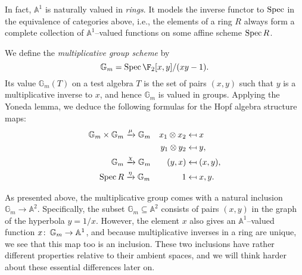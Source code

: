 \begin{remark}
In fact, $\mathbb A^1$ is naturally valued in \emph{rings}. It models the inverse functor to $\operatorname{Spec}$ in the equivalence of categories above, i.e., the elements of a ring $R$ always form a complete collection of $\mathbb A^1$--valued functions on some affine scheme $\operatorname{Spec} R$.
\end{remark}

\begin{example}
We define the \textit{multiplicative group scheme} by \[\mathbb G_m = \Spec \F_2[x, y] / (xy - 1).\]  Its value $\mathbb G_m(T)$ on a test algebra $T$ is the set of pairs $(x, y)$ such that $y$ is a multiplicative inverse to $x$, and hence $\mathbb G_m$ is valued in groups.  Applying the Yoneda lemma, we deduce the following formulas for the Hopf algebra structure maps:
\begin{align*}
\mathbb G_m \times \mathbb G_m & \xrightarrow{\mu} \mathbb G_m & x_1 \otimes x_2 & \mapsfrom x \\
& & y_1 \otimes y_2 & \mapsfrom y, \\
\mathbb G_m & \xrightarrow{\chi} \mathbb G_m & (y, x) & \mapsfrom (x, y), \\
\operatorname{Spec} R & \xrightarrow{\eta} \mathbb G_m & 1 & \mapsfrom x, y.
\end{align*}
\end{example}

\begin{remark}
As presented above, the multiplicative group comes with a natural inclusion $\mathbb G_m \to \mathbb A^2$.  Specifically, the subset $\mathbb G_m \subseteq \mathbb A^2$ consists of pairs $(x, y)$ in the graph of the hyperbola $y = 1/x$.  However, the element $x$ also gives an $\mathbb A^1$--valued function $x\colon\thinspace \mathbb G_m \to \mathbb A^1$, and because multiplicative inverses in a ring are unique, we see that this map too is an inclusion.  These two inclusions have rather different properties relative to their ambient spaces, and we will think harder about these essential differences later on.
\end{remark}

